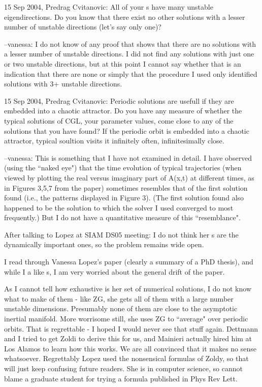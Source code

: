 15 Sep 2004, Predrag Cvitanovic:
All of your {\Rpo s} have many unstable
eigendirections. Do you know that there exist no other solutions with a
lesser number of unstable directions (let's say only one)?

--vanessa:
I do not know of any proof that shows that there are no solutions with a
lesser number of unstable directions.  I did not find any solutions with
just one or two unstable directions, but at this point I cannot say
whether that is an indication that there are none or simply that
the procedure I used only identified solutions with 3+ unstable
directions.

15 Sep 2004, Predrag Cvitanovic:
Periodic solutions are usefull if they are embedded into a chaotic
attractor. Do you have any measure of whether the typical solutions of
CGL, your parameter values, come close to any of the solutions that you
have found? If the periodic orbit is embedded into a chaotic attractor,
typical soultion visits it infinitely often, infinitesimally close.

--vanessa:
This is something that I have not examined in detail.  I have observed (using
the ``naked eye") that the time evolution of typical trajectories (when viewed
by plotting the real versus imaginary part of A(x,t) at different times, as in
Figures 3,5,7 from the paper) sometimes resembles that of the first solution
found (i.e., the patterns displayed in Figure 3). (The first solution
found also happened to be the solution to which the solver I used
converged to most frequently.)  But I do not have a
quantitative measure of this ``resemblance".

After talking to Lopez at SIAM DS05 meeting: I do not think
her \rpo s are the dynamically important ones, so the problem remains wide open.

I read through
Vanessa Lopez's paper (clearly a summary of a PhD thesis), and while I
a like {\rpo s}, I am very worried about the general drift
of the paper.

As I cannot tell how exhaustive is her set of numerical solutions, I do
not know what to make of them - like ZG, she gets all of them with a large
number unstable dimensions. Presumably none of them are close to the
asymptotic inertial manifold. More worrisome still, she uses ZG to
``average" over periodic orbits. That is regrettable - I hoped I would
never see that stuff again. Dettmann and I tried to get Zoldi to
derive this for us, and Mainieri actually hired him at Los Alamos to learn
how this works. We are all convinced that it makes no sense whatsoever.
Regrettably Lopez used the nonsensical formulas of Zoldy, so that will
just keep confusing future readers.
She is in computer science, so cannot
blame a graduate student for trying a formula published in Phys Rev Lett.


